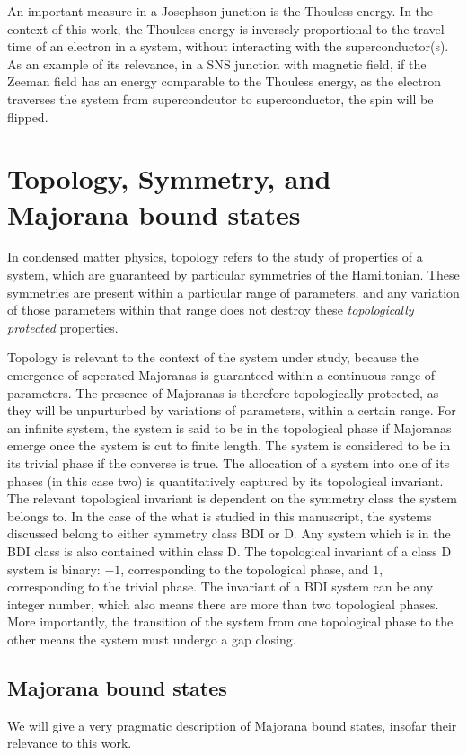 		An important measure in a Josephson junction is the Thouless energy.
		In the context of this work, the Thouless energy is inversely proportional to the travel time of an electron in a system, without interacting with the superconductor(s).
		As an example of its relevance, in a SNS junction with magnetic field, if the Zeeman field has an energy comparable to the Thouless energy, as the electron traverses the system from supercondcutor to superconductor, the spin will be flipped.

	
\section{Topology, Symmetry, and Majorana bound states}
	In condensed matter physics, topology refers to the study of properties of a system, which are guaranteed by particular symmetries of the Hamiltonian.
	These symmetries are present within a particular range of parameters, and any variation of those parameters within that range does not destroy these \emph{topologically protected} properties.
	
	Topology is relevant to the context of the system under study, because the emergence of seperated Majoranas is guaranteed within a continuous range of parameters.
	The presence of Majoranas is therefore topologically protected, as they will be unpurturbed by variations of parameters, within a certain range.
	For an infinite system, the system is said to be in the topological phase if Majoranas emerge once the system is cut to finite length.
	The system is considered to be in its trivial phase if the converse is true.
	The allocation of a system into one of its phases (in this case two) is quantitatively captured by its topological invariant.
	The relevant topological invariant is dependent on the symmetry class the system belongs to.
	In the case of the what is studied in this manuscript, the systems discussed belong to either symmetry class BDI or D.
	Any system which is in the BDI class is also contained within class D.
	The topological invariant of a class D system is binary: $-1$, corresponding to the topological phase, and $1$, corresponding to the trivial phase.
	The invariant of a BDI system can be any integer number, which also means there are more than two topological phases.
	More importantly, the transition of the system from one topological phase to the other means the system must undergo a gap closing.


	\subsection{Majorana bound states}
		We will give a very pragmatic description of Majorana bound states, insofar their relevance to this work.

